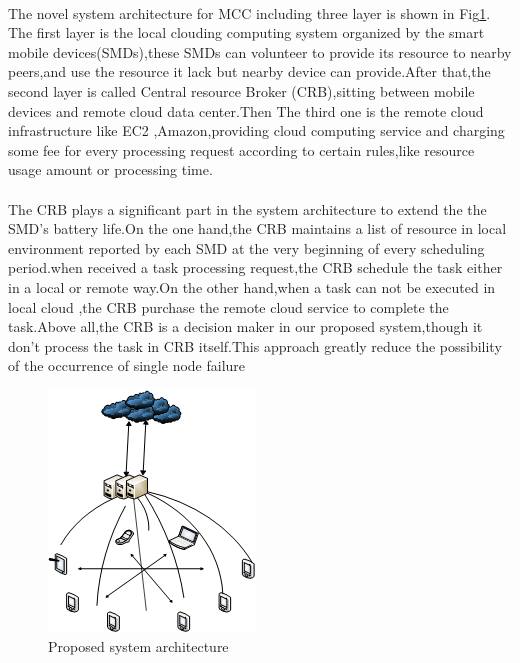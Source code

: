 \documentclass[review]{elsarticle}
\begin{document}
    \paragraph{}
    The novel system architecture for MCC including three layer is shown in Fig\ref{fig:architecture}. The first layer is the local clouding computing system organized by the smart mobile devices(SMDs),these SMDs can volunteer to provide its resource to nearby peers,and use the resource it lack but nearby device can provide.After that,the second layer is called Central resource Broker (CRB),sitting between mobile devices and remote cloud data center.Then The third one is the remote cloud infrastructure like EC2 ,Amazon,providing cloud computing service and charging some fee for every processing request according to certain rules,like resource usage amount or processing time.
    \paragraph{}
    The CRB plays a significant part in the system architecture to extend the the SMD's battery life.On the one hand,the CRB maintains a list of resource in local environment reported by each SMD at the very beginning of every scheduling period.when received a task processing request,the CRB schedule the task either in a local or remote way.On the other hand,when a task can not be executed in local cloud ,the CRB purchase the remote cloud service to complete the task.Above all,the CRB is a decision maker in our proposed system,though it don't process the task in CRB itself.This approach greatly reduce the possibility of the occurrence of single node failure


\begin{figure}[ht]
\centering
\includegraphics[scale=0.7]{architecture.png}
\caption{Proposed system architecture}
\label{fig:architecture}
\end{figure}
\end{document}
